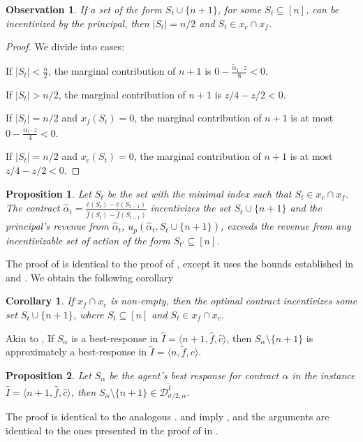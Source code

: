 \documentclass[11pt]{article}
\newtheorem{corollary}{Corollary}
\newtheorem{observation}{Observation}
\newtheorem{proposition}{Proposition}
\newcommand{\inst}[3]{\langle #1, #2, #3 \rangle}
\newcommand{\demand}[2]{\mathcal{D}_{{#1},{#2}}}
\newcommand{\BR}[3]{\demand{#1}{#2}^{#3}}
\newcommand{\tf}{\tilde{f}}
\newcommand{\talpha}{\tilde{\alpha}}
\newcommand{\hf}{\hat{f}}
\newcommand{\hc}{\hat{c}}
\newcommand{\halpha}{\hat{\alpha}}
\newcommand{\tI}{\tilde{I}}
\newcommand{\InstFTildeI}{\tI = \inst{n}{\tf}{c}}
\newcommand{\hI}{\hat{I}}
\newcommand{\InstHatI}{\hI = \inst{n+1}{\hf}{\hc}}
\begin{document}
\begin{observation}\label{obs:n+1Incentivizable_supmod_hf_hc}   
    If a set of the form $S_t \cup \{n+1\}$, for some $S_t \subseteq [n]$, can be incentivized by the principal, then $|S_t| = n/2$ and $S_t \in x_c \cap x_f$.
\end{observation}
\begin{proof}
We divide into cases: 

    If $|S_t| < \frac{n}{2}$, the marginal contribution of $n+1$ is $0 - \frac{\talpha_1\cdot z}{8} < 0$.
    
    If $|S_t|>n/2$, the marginal contribution of $n+1$ is $z/4 - z/2 < 0$.
    
    If $|S_t|=n/2$ and $x_f(S_t)=0$, the marginal contribution of $n+1$ is at most $0 - \frac{\talpha_t\cdot z}{4} < 0$.
    
    If $|S_t|=n/2$ and $x_c(S_t)=0$, the marginal contribution of $n+1$ is at most $z/4 - z/2 < 0$.
\end{proof}

    
\begin{proposition}\label{prop:n+1_is_optimal_supmod_hf_hc}
    Let $S_t$ be the set with the minimal index such that $S_t \in x_c \cap x_f$. 
    The contract $\halpha_t = \frac{\hc(S_t)-\hc(S_{t-1})}{\hf(S_t)-\hf(S_{t-1})}$ incentivizes the set $S_t \cup \{n+1\}$ and
    the principal's revenue from $\halpha_t$, $u_p(\halpha_t,S_t\cup\{n+1\})$, exceeds the revenue from any incentivizable set of action of the form $S_{t'} \subseteq [n]$.
\end{proposition}
The proof of  is identical to the proof of , except it uses the bounds established in  and .
We obtain the following corollary
\begin{corollary}\label{cor:opt_set_if_non_empty_intersection_sup-sup}
    If $x_f \cap x_c$ is non-empty, then the optimal contract incentivizes some set $S_t \cup \{n+1\}$, where $S_t \subseteq [n]$ and $S_t \in x_f \cap x_c$. 
\end{corollary}
    
Akin to , If $S_\alpha$ is a best-response in $\InstHatI$, then $S_\alpha \setminus \{n+1\}$ is approximately a best-response in $\InstFTildeI$.
\begin{proposition}\label{prop:BR_in_approxDemand_sup-sup}
    Let $S_\alpha$ be the agent's best response for contract $\alpha$ in the instance $\InstHatI$, then 
    $S_\alpha \setminus\{n+1\} \in \BR{\sigma/2}{\alpha}{\tI}$.
\end{proposition}
The proof is identical to the analogous .
 and  imply , and the arguments are identical to the ones presented in the proof of   in .
\end{document}
